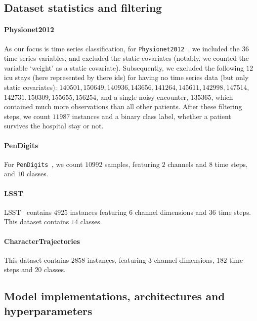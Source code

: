 \documentclass{article}
\begin{document}
\subsection{Dataset statistics and filtering} \label{supp: Dataset stats}
\paragraph{Physionet2012}
As our focus is time series classification, for \texttt{Physionet2012}~\citep{goldberger2000physiobank}, we included the 36 time series variables, and excluded the static covariates (notably, we counted the variable `weight' as a static covariate). Subsequently, we excluded the following $12$ icu stays (here represented by there ids) for having no time series data (but only static covariates): $140501, 150649, 140936, 143656, 141264, 145611, 142998, 147514,$  $142731, 150309, 155655, 156254 $, and a single noisy encounter, $135365$, which contained much more observations than all other patients. After these filtering steps, we count $11987$ instances and a binary class label, whether a patient survives the hospital stay or not.

\paragraph{PenDigits}
For \texttt{PenDigits}~\citep{Dua2019}, we count $10992$ samples, featuring $2$ channels and $8$ time steps, and $10$ classes.

\paragraph{LSST}
LSST~\citep{allam2018photometric} contains $4925$ instances featuring $6$ channel dimensions and $36$ time steps. This dataset contains $14$ classes.

 \paragraph{CharacterTrajectories~\citep{Dua2019}}
 This dataset contains $2858$ instances, featuring $3$ channel dimensions, $182$ time steps and $20$ classes.


\subsection{Model implementations, architectures and hyperparameters} \label{supp: Model Architectures}
\end{document}
